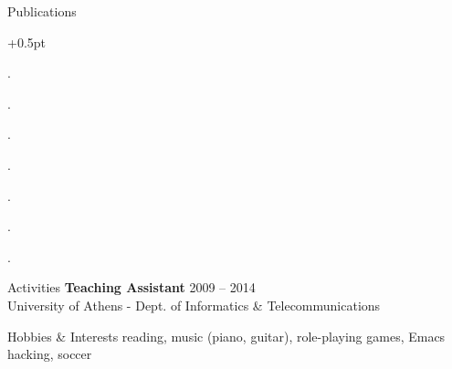 \documentclass{resume}
\begin{document}

\begin{rSection}{Publications}
  \begin{rSubsection}{}{}{}{}
    \itemsep +0.5pt %
  \item {}.
  \item {}.
  \item {}.
  \item {}.
  \item {}.
  \item {}.
  \item {}.
  \end{rSubsection}
\end{rSection}




\begin{rSection}{Activities}
  {\bf Teaching Assistant} \hfill {2009 -- 2014} \\
  University of Athens - Dept. of Informatics \& Telecommunications \\
\end{rSection}

\begin{rSection}{Hobbies \& Interests}
  reading, music (piano, guitar), role-playing games, Emacs hacking, soccer \\
\end{rSection}
\end{document}
